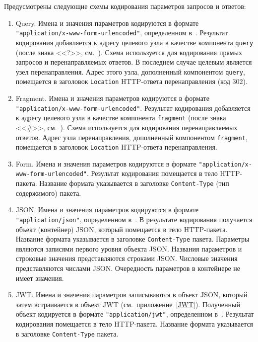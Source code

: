 Предусмотрены следующие схемы кодирования параметров запросов и ответов:
\begin{enumerate}
\item
Query. 
Имена и значения параметров кодируются в формате 
\lstinline{"application/x-www-form-urlencoded"}, определенном в~\cite{HTML4}. 
%
Результат кодирования добавляется к адресу целевого узла в качестве 
компонента \lstinline{query} (после знака <<?>>, см.~\cite{RFC3986}).
%
Схема используется для кодирования прямых запросов и перенаправляемых ответов.
%
В последнем случае целевым является узел перенаправления.
%
Адрес этого узла, дополненный компонентом \lstinline{query}, 
помещается в заголовок \lstinline{Location} HTTP-ответа перенаправления 
(код 302). 

\item
Fragment.
Имена и значения параметров кодируются в формате 
\lstinline{"application/x-www-form-urlencoded"}.
%
Результат кодирования добавляется к адресу целевого узла в качестве 
компонента \lstinline{fragment} (после знака <<\#>>, см.~\cite{RFC3986}).
%
Схема используется для кодирования перенаправляемых ответов.
%
Адрес узла перенаправления, дополненный компонентом \lstinline{fragment}, 
помещается в заголовок \lstinline{Location} HTTP-ответа перенаправления. 

\item
Form.
Имена и значения параметров кодируются в формате 
\lstinline{"application/x-www-form-urlencoded"}. 
%
Результат кодирования помещается в тело HTTP-пакета. 
%
Название формата указывается в заголовке \lstinline{Content-Type} 
(тип содержимого) пакета.  

\item
JSON.
Имена и значения параметров кодируются в формате \lstinline{"application/json"}, 
определенном в~\cite{RFC4627}. В результате кодирования получается объект 
(контейнер) JSON, который помещается в тело HTTP-пакета. 
Название формата указывается в заголовке \lstinline{Content-Type} пакета. 
%
Параметры являются записями первого уровня объекта JSON.
Названия параметров и строковые значения представляются строками JSON.
Числовые значения представляются числами JSON.
Очередность параметров в контейнере не имеет значения.

\item
JWT.
Имена и значения параметров записываются в объект JSON, который затем 
встраивается в объект JWT (см.~приложение~\ref{JWT}).
%
Полученный объект кодируется в формате \lstinline{"application/jwt"}, 
определенном в~\cite{RFC7519}.
%
Результат кодирования помещается в тело HTTP-пакета. Название формата 
указывается в заголовке \lstinline{Content-Type} пакета. 


\end{enumerate}
